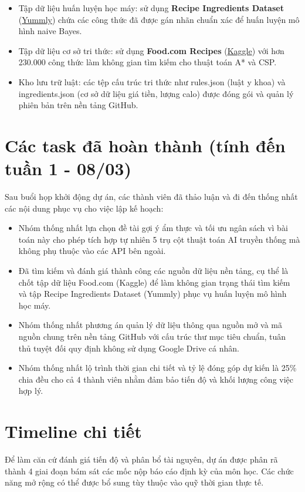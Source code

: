 \documentclass[a4paper, 12pt]{article}
\begin{document}
\begin{itemize}
    \item Tập dữ liệu huấn luyện học máy: sử dụng \textbf{Recipe Ingredients Dataset} (\href{https://www.kaggle.com/datasets/kaggle/recipe-ingredients-dataset/data}{Yummly}) chứa các công thức đã được gán nhãn chuẩn xác để huấn luyện mô hình naive Bayes.
    \item Tập dữ liệu cơ sở tri thức: sử dụng \textbf{Food.com Recipes} (\href{https://www.kaggle.com/datasets/shuyangli94/food-com-recipes-and-user-interactions}{Kaggle}) với hơn 230.000 công thức làm không gian tìm kiếm cho thuật toán A* và CSP. 
    \item Kho lưu trữ luật: các tệp cấu trúc tri thức như {rules.json} (luật y khoa) và {ingredients.json} (cơ sở dữ liệu giá tiền, lượng calo) được đóng gói và quản lý phiên bản trên nền tảng GitHub.
\end{itemize}

\section{Các task đã hoàn thành (tính đến tuần 1 - 08/03)}
Sau buổi họp khởi động dự án, các thành viên đã thảo luận và đi đến thống nhất các nội dung phục vụ cho việc lập kế hoạch:
\begin{itemize}
    \item Nhóm thống nhất lựa chọn đề tài gợi ý ẩm thực và tối ưu ngân sách vì bài toán này cho phép tích hợp tự nhiên 5 trụ cột thuật toán AI truyền thống mà không phụ thuộc vào các API bên ngoài.
    \item Đã tìm kiếm và đánh giá thành công các nguồn dữ liệu nền tảng, cụ thể là chốt tập dữ liệu Food.com (Kaggle) để làm không gian trạng thái tìm kiếm và tập Recipe Ingredients Dataset (Yummly) phục vụ huấn luyện mô hình học máy. 
    \item Nhóm thống nhất phương án quản lý dữ liệu thông qua nguồn mở và mã nguồn chung trên nền tảng GitHub với cấu trúc thư mục tiêu chuẩn, tuân thủ tuyệt đối quy định không sử dụng Google Drive cá nhân.
    \item Nhóm thống nhất lộ trình thời gian chi tiết và tỷ lệ đóng góp dự kiến là 25\% chia đều cho cả 4 thành viên nhằm đảm bảo tiến độ và khối lượng công việc hợp lý.
\end{itemize}

\section{Timeline chi tiết}
Để làm căn cứ đánh giá tiến độ và phân bổ tài nguyên, dự án được phân rã thành 4 giai đoạn bám sát các mốc nộp báo cáo định kỳ của môn học. Các chức năng mở rộng có thể được bổ sung tùy thuộc vào quỹ thời gian thực tế.
\end{document}
